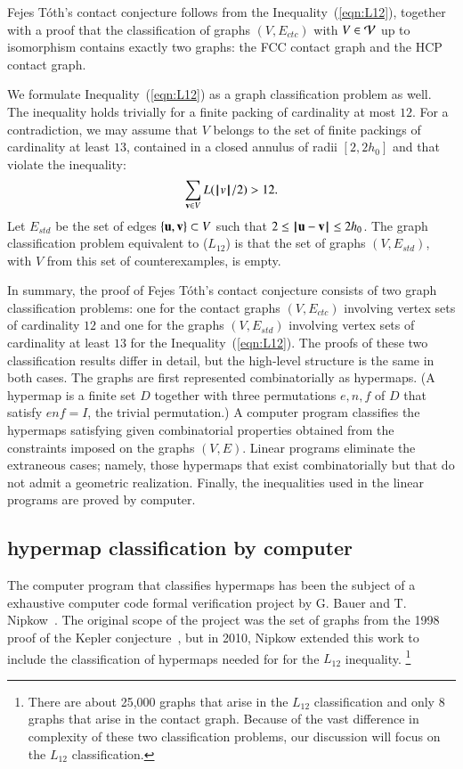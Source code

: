 \documentclass{llncs}
\begin{document}
Fejes T\'oth's contact conjecture follows from the
Inequality~(\ref{eqn:L12}), together with a proof that the
classification of graphs $(V,E_{ctc})$ with $V\in {\mathcal V}$ up to
isomorphism contains exactly two graphs: the FCC contact graph and the
HCP contact graph.

We formulate Inequality~(\ref{eqn:L12}) as a graph classification
problem as well.  The inequality holds trivially for a finite packing
of cardinality at most $12$.  For a contradiction, we may assume that
$V$ belongs to the set of finite packings of cardinality at least $13$,
contained in a closed annulus of radii $[2,2h_0]$ and that violate the
inequality:
\[
\sum_{{\mathbf v}\in V} L({{\hskip0.1em|\hskip-0.15em|\hskip0.1em}v{\hskip0.1em|\hskip-0.15em|\hskip0.1em}}/2) > 12.
\]
Let $E_{std}$ be the set of edges $\{{\mathbf u},{\mathbf v}\}\subset V$ such that
$2\le\norm{\u}{\v}\le 2h_0$.  The graph classification problem
equivalent to ($L_{12}$) is that the set of graphs $(V,E_{std})$, with
$V$ from this set of counterexamples, is empty.

In summary, the proof of Fejes T\'oth's contact conjecture consists of
two graph classification problems: one for the contact graphs
$(V,E_{ctc})$ involving vertex sets of cardinality $12$ and one for
the graphs $(V,E_{std})$ involving vertex sets of cardinality at least
$13$ for the Inequality~(\ref{eqn:L12}).  The proofs of these two
classification results differ in detail, but the high-level structure
is the same in both cases.  The graphs are first represented
combinatorially as hypermaps.  (A hypermap is a finite set $D$
together with three permutations $e,n,f$ of $D$ that satisfy $e n f =
I$, the trivial permutation.)  A computer program classifies the
hypermaps satisfying given combinatorial properties obtained from the
constraints imposed on the graphs $(V,E)$.  Linear programs eliminate
the extraneous cases; namely, those hypermaps that exist
combinatorially but that do not admit a geometric realization.
Finally, the inequalities used in the linear programs are proved by
computer.

\subsection{hypermap classification by computer}

The computer program that classifies hypermaps has been the subject of
a exhaustive computer code formal verification project by G. Bauer and
T. Nipkow~\cite{Nipkow:2005:Tame}.  The original scope of the project
was the set of graphs from the 1998 proof of the Kepler
conjecture~\cite{Hales:2006:DCG}, but in 2010, Nipkow extended this
work to include the classification of hypermaps needed for for the
$L_{12}$ inequality.  \footnote{There are about 25,000 graphs that
  arise in the $L_{12}$ classification and only $8$ graphs that arise
  in the contact graph.  Because of the vast difference in complexity
  of these two classification problems, our discussion will focus on
  the $L_{12}$ classification.}
\end{document}
